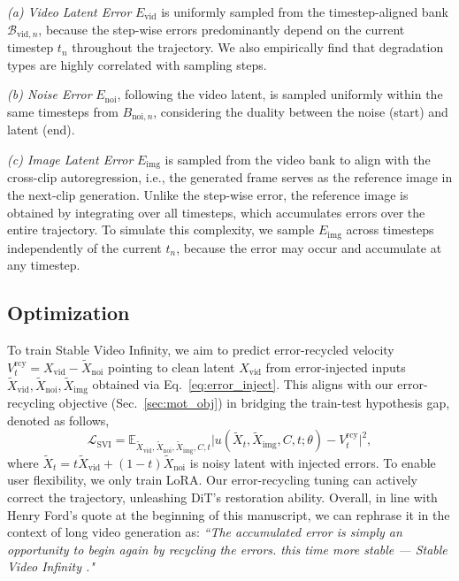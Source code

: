 \documentclass{article} %
\newcommand\vid{\mathrm{vid}}
\newcommand\rcy{\mathrm{rcy}}
\newcommand\noi{\mathrm{noi}}
\newcommand\img{\mathrm{img}}
\newcommand{\err}{E}
\newcommand{\bank}{\mathcal{B}}
\newcommand{\method}{Stable Video Infinity }
\newcommand{\cond}{C}
\begin{document}
\vspace{-3pt}
\emph{(a) Video Latent Error} $\err_{\mathrm{vid}}$ is uniformly sampled from the timestep-aligned bank $\bank_{\vid,n}$, because the step-wise errors predominantly depend on the current timestep $t_n$ throughout the trajectory. We also empirically find that degradation types are highly correlated with sampling steps. 

\vspace{-3pt}
\emph{(b) Noise Error} $\err_{\mathrm{noi}}$, following the video latent, is sampled uniformly within the same timesteps from ${B}_{\noi,n}$, considering the duality between the noise (start) and latent (end). 

\vspace{-3pt}
\emph{(c) Image Latent Error} $\err_{\mathrm{img}}$ is sampled from the video bank to align with the cross-clip autoregression, i.e., the generated frame serves as the reference image in the next-clip generation. Unlike the step-wise error, the reference image is obtained by integrating over all timesteps, which accumulates errors over the entire trajectory. To simulate this complexity, we sample $\err_\img$ across timesteps independently of the current $t_n$, because the error may occur and accumulate at any timestep.

\subsection{Optimization}\label{sec:method_optimize}
\vspace{-3pt}
To train Stable Video Infinity, we aim to predict {error-recycled velocity} $ V^\rcy_t =X_\vid-\tilde{X}_\noi$ pointing to clean latent $X_\vid$ from {error-injected inputs} $\tilde{X}_\vid, \tilde{X}_\noi,\tilde{X}_\img$ obtained via Eq.~\ref{eq:error_inject}. This aligns with our error-recycling objective (Sec.~\ref{sec:mot_obj}) in bridging the train-test hypothesis gap, denoted as follows,
\begin{equation}\label{eq:training}
\mathcal{L}_{\mathrm{SVI}} = \mathbb{E}_{\tilde{X}_\vid, \tilde{X}_\noi,\tilde{X}_\img,\cond,t}\big|u(\tilde{X}_{t},\tilde{X}_\img,\cond, t; \theta) - V^\rcy_t\big|^2,
\end{equation}
where $\tilde{X}_t = t\tilde{X}_\vid + (1 - t)\tilde{X}_\noi$ is noisy latent with injected errors. To enable user flexibility, we only train LoRA. Our error-recycling tuning can actively correct the trajectory, unleashing DiT's restoration ability. Overall, in line with Henry Ford’s quote at the beginning of this manuscript, we can rephrase it in the context of long video generation as: \emph{``The accumulated error is simply an opportunity to begin again by recycling the errors. this time more stable — \method."}
\end{document}
